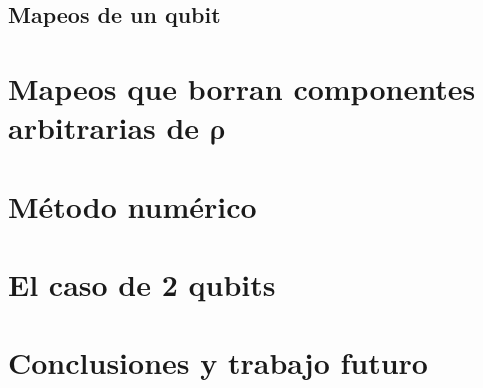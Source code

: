 \documentclass[11pt,dvipsnames]{report}
\begin{document}
\section{Mapeos de un qubit}



\chapter{Mapeos que borran componentes arbitrarias de $\boldsymbol{\rho}$}



\chapter{Método numérico}



\chapter{El caso de 2 qubits}



\chapter{Conclusiones y trabajo futuro}





\end{document}
